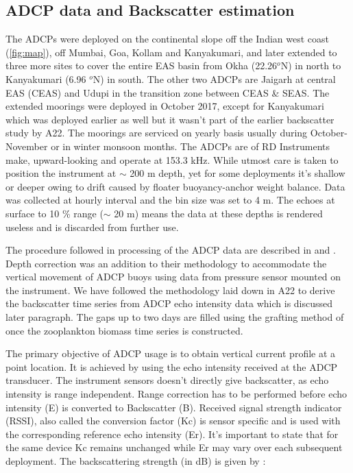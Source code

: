 \documentclass{article}
\begin{document}
	\subsection{ADCP data and Backscatter estimation}
	The ADCPs were deployed on the continental slope off the Indian west coast (\cref{fig:map}), off Mumbai, Goa, Kollam and Kanyakumari, and later extended to three more sites to cover the entire EAS basin from Okha (22.26$^o$N) in north to Kanyakumari (6.96 $^o$N) in south. The other two ADCPs are  Jaigarh at central EAS (CEAS) and Udupi in the transition zone between CEAS \& SEAS. The extended moorings were deployed in October 2017, except for Kanyakumari which was deployed earlier as well but it wasn't part of the earlier backscatter study by A22. The moorings are serviced on yearly basis usually during October-November or in winter monsoon months. The ADCPs are of RD Instruments make, upward-looking and operate at 153.3 kHz. While utmost care is taken to position the instrument at  $\sim$ 200 m depth, yet for some deployments it's shallow or deeper owing to drift caused by floater buoyancy-anchor weight balance. Data was collected at hourly interval and the bin size was set to 4 m. The echoes at surface to 10 \% range ($\sim$ 20 m) means the data at these depths is rendered useless and is discarded from further use. 
	
	The procedure followed in processing of the ADCP data are described in \citet{amol2014observed} and \citet{mukherjee2014observed}. Depth correction was an addition to their methodology to accommodate the vertical movement of ADCP buoys \citep{chaudhuri2020observed, mukhopadhyay2020observed}
    using data from pressure sensor mounted on the instrument. We have followed the methodology laid down in A22 to derive the backscatter time series from ADCP echo intensity data which is discussed later paragraph. The gaps up to two days are filled using the grafting method of \citet{mukhopadhyay2020observed} once the zooplankton biomass time series is constructed.
    
	The primary objective of ADCP usage is to obtain vertical current profile at a point location. It is achieved by using the echo intensity received at the ADCP transducer. The instrument sensors doesn't directly give backscatter, as echo intensity is range independent. Range correction has to be performed before echo intensity (E) is converted to Backscatter (B). Received signal strength indicator (RSSI), also called the conversion factor (Kc) is sensor specific and is used with the corresponding reference echo intensity (Er). It's important to state that for the same device Kc remains unchanged while Er may vary over each subsequent deployment. The backscattering strength (in dB) is given by \citet{mullison2017backscatter}:
	
\end{document}

